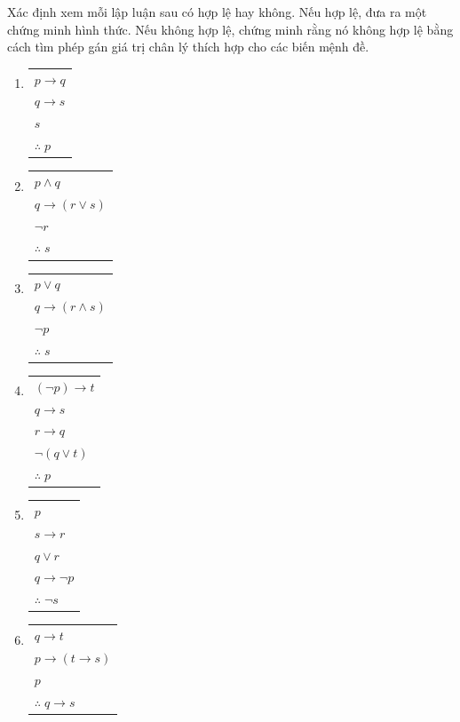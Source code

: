 \begin{exercise}
Xác định xem mỗi lập luận sau có hợp lệ hay không. Nếu hợp lệ, đưa ra một chứng minh hình thức. Nếu không hợp lệ, chứng minh rằng nó không hợp lệ bằng cách tìm phép gán giá trị chân lý thích hợp cho các biến mệnh đề.
\begin{enumerate}[label=\alph*)]
\item
\begin{tabular}[t]{l}
$p \to q$ \\
$q \to s$ \\
$s$ \\
\hline
$\therefore\; p$
\end{tabular}

\item
\begin{tabular}[t]{l}
$p \land q$ \\
$q \to (r \lor s)$ \\
$\neg r$ \\
\hline
$\therefore\; s$
\end{tabular}

\item
\begin{tabular}[t]{l}
$p \lor q$ \\
$q \to (r \land s)$ \\
$\neg p$ \\
\hline
$\therefore\; s$
\end{tabular}

\item
\begin{tabular}[t]{l}
$(\neg p) \to t$ \\
$q \to s$ \\
$r \to q$ \\
$\neg(q \lor t)$ \\
\hline
$\therefore\; p$
\end{tabular}

\item
\begin{tabular}[t]{l}
$p$ \\
$s \to r$ \\
$q \lor r$ \\
$q \to \neg p$ \\
\hline
$\therefore\; \neg s$
\end{tabular}

\item
\begin{tabular}[t]{l}
$q \to t$ \\
$p \to (t \to s)$ \\
$p$ \\
\hline
$\therefore\; q \to s$
\end{tabular}
\end{enumerate}
\end{exercise}


